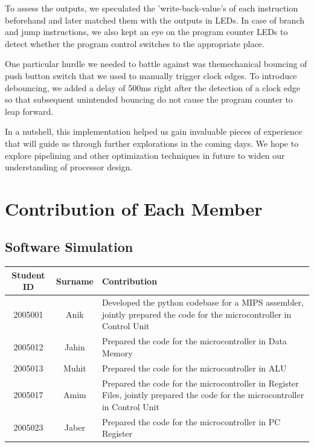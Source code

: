 \documentclass{article}
\begin{document}
		To assess the outputs, we speculated the 'write-back-value's of each instruction beforehand and later matched them with the outputs in LEDs. In case of branch and jump instructions, we also kept an eye on the program counter LEDs to detect whether the program control switches to the appropriate place. 
		
		One particular hurdle we needed to battle against was themechanical bouncing of push button switch that we used to manually trigger clock edges. To introduce debouncing, we added a delay of 500ms right after the detection of a clock edge so that subsequent unintended bouncing do not cause the program counter to leap forward.
		
		
		In a nutshell, this implementation helped us gain invaluable pieces of experience that will guide us through further explorations in the coming days. We hope to explore pipelining and other optimization techniques in future to widen our understanding of processor design.
		
		
		
		
		\newpage
		
		
		\section{Contribution of Each Member}
		
		
		
		\subsection{Software Simulation}
		
		
		
		\begin{table}[h]
			\centering
			\begin{tabular}{|c|c|m{10cm}|}
				\hline
				Student ID & Surname & Contribution \\ 
				\hline
				2005001    & Anik    & Developed the python codebase for a MIPS assembler, jointly prepared the code for the microcontroller in Control Unit    \\ 
				\hline
				2005012    & Jahin   & Prepared the code for the microcontroller in Data Memory \\ 
				\hline
				2005013    & Muhit   & Prepared the code for the microcontroller in ALU  \\ 
				\hline
				2005017    & Amim    &  Prepared the code for the microcontroller in Register Files, jointly prepared the code for the microcontroller in Control Unit    \\ 
				\hline
				2005023    & Jaber   &  Prepared the code for the microcontroller in PC Register \\ 
				\hline
			\end{tabular}
		\end{table}
		
\end{document}
